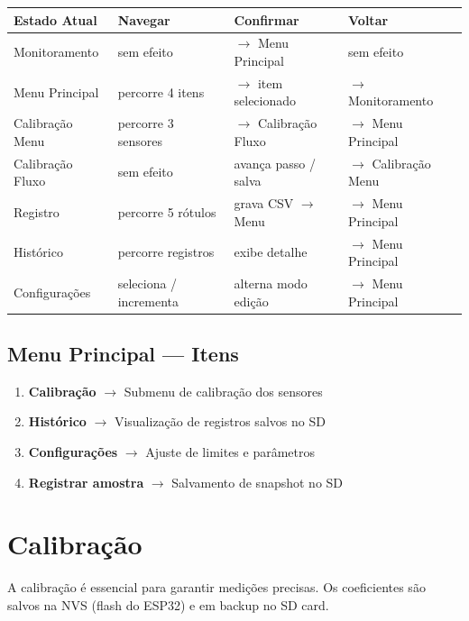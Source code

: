 \documentclass[12pt,a4paper]{article}
\begin{document}
\begin{tabularx}{\textwidth}{l X X X}
\toprule
\textbf{Estado Atual} & \textbf{Navegar} & \textbf{Confirmar} & \textbf{Voltar} \\
\midrule
Monitoramento & sem efeito & $\rightarrow$ Menu Principal & sem efeito \\
Menu Principal & percorre 4 itens & $\rightarrow$ item selecionado & $\rightarrow$ Monitoramento \\
Calibração Menu & percorre 3 sensores & $\rightarrow$ Calibração Fluxo & $\rightarrow$ Menu Principal \\
Calibração Fluxo & sem efeito & avança passo / salva & $\rightarrow$ Calibração Menu \\
Registro & percorre 5 rótulos & grava CSV $\rightarrow$ Menu & $\rightarrow$ Menu Principal \\
Histórico & percorre registros & exibe detalhe & $\rightarrow$ Menu Principal \\
Configurações & seleciona / incrementa & alterna modo edição & $\rightarrow$ Menu Principal \\
\bottomrule
\end{tabularx}

\subsection{Menu Principal --- Itens}

\begin{enumerate}[nosep]
  \item \textbf{Calibração} $\rightarrow$ Submenu de calibração dos sensores
  \item \textbf{Histórico} $\rightarrow$ Visualização de registros salvos no SD
  \item \textbf{Configurações} $\rightarrow$ Ajuste de limites e parâmetros
  \item \textbf{Registrar amostra} $\rightarrow$ Salvamento de snapshot no SD
\end{enumerate}

\section{Calibração}

A calibração é essencial para garantir medições precisas. Os coeficientes são salvos na NVS (flash do ESP32) e em backup no SD card.
\end{document}
